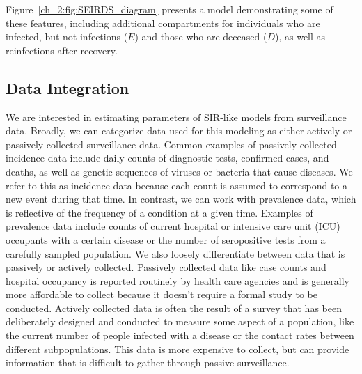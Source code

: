 Figure~\ref{ch_2:fig:SEIRDS_diagram} presents a model demonstrating some of these features, including additional compartments for individuals who are infected, but not infections (\( E \)) and those who are deceased (\( D \)), as well as reinfections after recovery.

\subsection{Data Integration}
\label{ch_2:sec:data_integration}
We are interested in estimating parameters of SIR-like models from surveillance data.
Broadly, we can categorize data used for this modeling as either actively or passively collected surveillance data.
Common examples of passively collected incidence data include daily counts of diagnostic tests, confirmed cases, and deaths, as well as genetic sequences of viruses or bacteria that cause diseases.
We refer to this as incidence data because each count is assumed to correspond to a new event during that time.
In contrast, we can work with prevalence data, which is reflective of the frequency of a condition at a given time.
Examples of prevalence data include counts of current hospital or intensive care unit (ICU) occupants with a certain disease or the number of seropositive tests from a carefully sampled population.
We also loosely differentiate between data that is passively or actively collected.
Passively collected data like case counts and hospital occupancy is reported routinely by health care agencies and is generally more affordable to collect because it doesn't require a formal study to be conducted.
Actively collected data is often the result of a survey that has been deliberately designed and conducted to measure some aspect of a population, like the current number of people infected with a disease or the contact rates between different subpopulations.
This data is more expensive to collect, but can provide information that is difficult to gather through passive surveillance.

